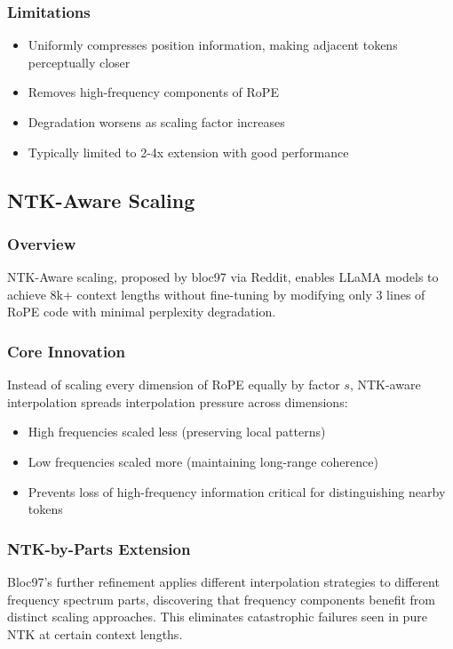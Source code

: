 \documentclass[11pt,letterpaper]{article}
\begin{document}
\subsubsection{Limitations}
\begin{itemize}[leftmargin=*]
    \item Uniformly compresses position information, making adjacent tokens perceptually closer
    \item Removes high-frequency components of RoPE
    \item Degradation worsens as scaling factor increases
    \item Typically limited to 2-4x extension with good performance
\end{itemize}

\subsection{NTK-Aware Scaling}

\subsubsection{Overview}
NTK-Aware scaling, proposed by bloc97 via Reddit, enables LLaMA models to achieve 8k+ context lengths without fine-tuning by modifying only 3 lines of RoPE code with minimal perplexity degradation.

\subsubsection{Core Innovation}
Instead of scaling every dimension of RoPE equally by factor $s$, NTK-aware interpolation spreads interpolation pressure across dimensions:
\begin{itemize}[leftmargin=*]
    \item High frequencies scaled less (preserving local patterns)
    \item Low frequencies scaled more (maintaining long-range coherence)
    \item Prevents loss of high-frequency information critical for distinguishing nearby tokens
\end{itemize}

\subsubsection{NTK-by-Parts Extension}
Bloc97's further refinement applies different interpolation strategies to different frequency spectrum parts, discovering that frequency components benefit from distinct scaling approaches. This eliminates catastrophic failures seen in pure NTK at certain context lengths.
\end{document}
